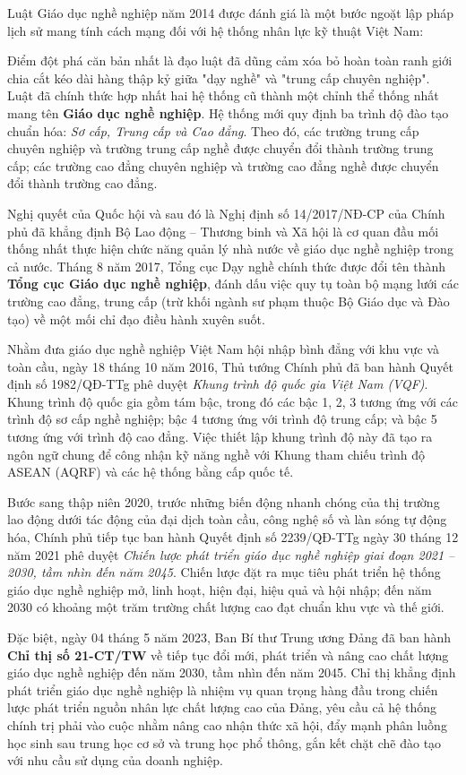 Luật Giáo dục nghề nghiệp năm 2014 được đánh giá là một bước ngoặt lập pháp lịch sử mang tính cách mạng đối với hệ thống nhân lực kỹ thuật Việt Nam:

Điểm đột phá căn bản nhất là đạo luật đã dũng cảm xóa bỏ hoàn toàn ranh giới chia cắt kéo dài hàng thập kỷ giữa "dạy nghề" và "trung cấp chuyên nghiệp". Luật đã chính thức hợp nhất hai hệ thống cũ thành một chỉnh thể thống nhất mang tên \textbf{Giáo dục nghề nghiệp}. Hệ thống mới quy định ba trình độ đào tạo chuẩn hóa: \textit{Sơ cấp, Trung cấp và Cao đẳng}. Theo đó, các trường trung cấp chuyên nghiệp và trường trung cấp nghề được chuyển đổi thành trường trung cấp; các trường cao đẳng chuyên nghiệp và trường cao đẳng nghề được chuyển đổi thành trường cao đẳng. 

Nghị quyết của Quốc hội và sau đó là Nghị định số 14/2017/NĐ-CP của Chính phủ đã khẳng định Bộ Lao động -- Thương binh và Xã hội là cơ quan đầu mối thống nhất thực hiện chức năng quản lý nhà nước về giáo dục nghề nghiệp trong cả nước. Tháng 8 năm 2017, Tổng cục Dạy nghề chính thức được đổi tên thành \textbf{Tổng cục Giáo dục nghề nghiệp}, đánh dấu việc quy tụ toàn bộ mạng lưới các trường cao đẳng, trung cấp (trừ khối ngành sư phạm thuộc Bộ Giáo dục và Đào tạo) về một mối chỉ đạo điều hành xuyên suốt.

Nhằm đưa giáo dục nghề nghiệp Việt Nam hội nhập bình đẳng với khu vực và toàn cầu, ngày 18 tháng 10 năm 2016, Thủ tướng Chính phủ đã ban hành Quyết định số 1982/QĐ-TTg phê duyệt \textit{Khung trình độ quốc gia Việt Nam (VQF)}. Khung trình độ quốc gia gồm tám bậc, trong đó các bậc 1, 2, 3 tương ứng với các trình độ sơ cấp nghề nghiệp; bậc 4 tương ứng với trình độ trung cấp; và bậc 5 tương ứng với trình độ cao đẳng. Việc thiết lập khung trình độ này đã tạo ra ngôn ngữ chung để công nhận kỹ năng nghề với Khung tham chiếu trình độ ASEAN (AQRF) và các hệ thống bằng cấp quốc tế.

Bước sang thập niên 2020, trước những biến động nhanh chóng của thị trường lao động dưới tác động của đại dịch toàn cầu, công nghệ số và làn sóng tự động hóa, Chính phủ tiếp tục ban hành Quyết định số 2239/QĐ-TTg ngày 30 tháng 12 năm 2021 phê duyệt \textit{Chiến lược phát triển giáo dục nghề nghiệp giai đoạn 2021 -- 2030, tầm nhìn đến năm 2045}. Chiến lược đặt ra mục tiêu phát triển hệ thống giáo dục nghề nghiệp mở, linh hoạt, hiện đại, hiệu quả và hội nhập; đến năm 2030 có khoảng một trăm trường chất lượng cao đạt chuẩn khu vực và thế giới.

Đặc biệt, ngày 04 tháng 5 năm 2023, Ban Bí thư Trung ương Đảng đã ban hành \textbf{Chỉ thị số 21-CT/TW} về tiếp tục đổi mới, phát triển và nâng cao chất lượng giáo dục nghề nghiệp đến năm 2030, tầm nhìn đến năm 2045. Chỉ thị khẳng định phát triển giáo dục nghề nghiệp là nhiệm vụ quan trọng hàng đầu trong chiến lược phát triển nguồn nhân lực chất lượng cao của Đảng, yêu cầu cả hệ thống chính trị phải vào cuộc nhằm nâng cao nhận thức xã hội, đẩy mạnh phân luồng học sinh sau trung học cơ sở và trung học phổ thông, gắn kết chặt chẽ đào tạo với nhu cầu sử dụng của doanh nghiệp.

